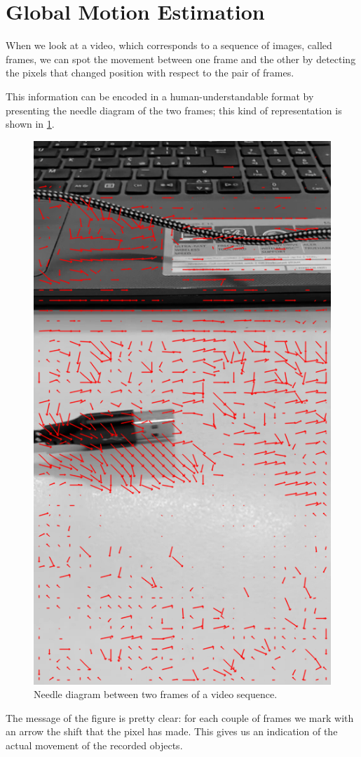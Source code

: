 \section{Global Motion Estimation}
\label{sec:02-gme}
When we look at a video, which corresponds to a sequence of images, called frames, we can spot the movement between one frame and the other by detecting the pixels that changed position with respect to the pair of frames.

This information can be encoded in a human-understandable format by presenting the needle diagram of the two frames; this kind of representation is shown in \cref{fig:needle-diagram}.

\begin{figure}
    \centering
    \includegraphics[width=.7\linewidth]{../assets/images/bbme-0-res.png}
    \caption{Needle diagram between two frames of a video sequence.}
    \label{fig:needle-diagram}
\end{figure}

The message of the figure is pretty clear: for each couple of frames we mark with an arrow the shift that the pixel has made. This gives us an indication of the actual movement of the recorded objects.

